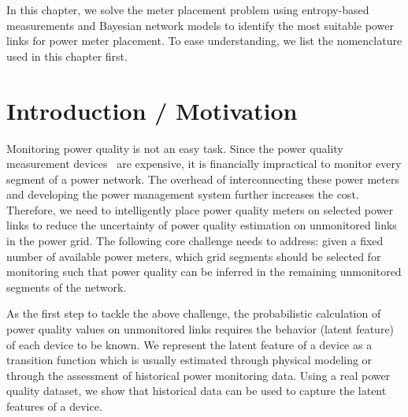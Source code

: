 \label{chap:meterPlacement}
In this chapter, we solve the meter placement problem using entropy-based measurements and Bayesian network models to identify the most suitable power links for power meter placement. To ease understanding, we list the nomenclature used in this chapter first. 

\small
\setlength{\nomitemsep}{-0.1em}
\printnomenclature

\normalsize
\section{Introduction / Motivation}
Monitoring power quality is not an easy task. Since the power quality measurement devices~\cite{schneider_meter} are expensive, it is financially impractical to monitor every segment of a power network. The overhead of interconnecting these power meters and developing the power management system further increases the cost. Therefore, we need to intelligently place power quality meters on selected power links to reduce the uncertainty of power quality estimation on unmonitored links in the power grid. The following core challenge needs to address: given a fixed number of available power meters, which grid segments should be selected for monitoring such that power quality can be inferred in the remaining unmonitored segments of the network.

As the first step to tackle the above challenge, the probabilistic calculation of power quality values on unmonitored links requires the behavior (latent feature) of each device to be known. We represent the latent feature of a device as a transition function which is usually estimated through physical modeling or through the assessment of historical power monitoring data. Using a real power quality dataset, we show that historical data can be used to capture the latent features of a device.

